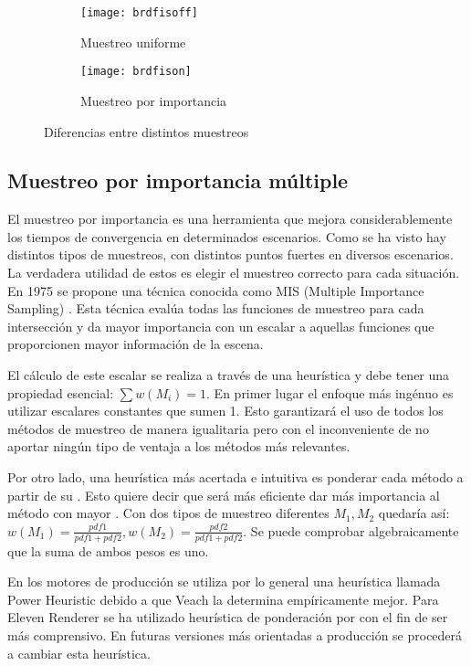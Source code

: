 \begin{figure}[H]
	\label{fig:brdfis}
	\centering
  \begin{subfigure}[b]{0.45\textwidth}
	\texttt{[image: brdfisoff]}
	\caption{Muestreo uniforme}
	\label{fig:brdfisoff}
  \end{subfigure}
  \hfill
  \begin{subfigure}[b]{0.45\textwidth}
	\texttt{[image: brdfison]}
	\caption{Muestreo por importancia}
	\label{fig:brdfison}
  \end{subfigure}
  \caption{Diferencias entre distintos muestreos}
\end{figure}

\subsection{Muestreo por importancia múltiple}

El muestreo por importancia es una herramienta que mejora considerablemente los tiempos de convergencia en determinados escenarios. Como se ha visto hay distintos tipos de muestreos, con distintos puntos fuertes en diversos escenarios. La verdadera utilidad de estos es elegir el muestreo correcto para cada situación. En 1975 se propone una técnica conocida como MIS (Multiple Importance Sampling) \cite{veach1995optimally}. Esta técnica evalúa todas las funciones de muestreo para cada intersección y da mayor importancia con un escalar a aquellas funciones que proporcionen mayor información de la escena.

El cálculo de este escalar se realiza a través de una heurística y debe tener una propiedad esencial: $\sum{w(M_i)} = 1$. En primer lugar el enfoque más ingénuo es utilizar escalares constantes que sumen 1. Esto garantizará el uso de todos los métodos de muestreo de manera igualitaria pero con el inconveniente de no aportar ningún tipo de ventaja a los métodos más relevantes. 

Por otro lado, una heurística más acertada e intuitiva es ponderar cada método a partir de su . Esto quiere decir que será más eficiente dar más importancia al método con mayor . Con dos tipos de muestreo diferentes $M_1, M_2$ quedaría así: $w(M_1) = \frac{pdf1}{pdf1 + pdf2}, w(M_2) = \frac{pdf2}{pdf1 + pdf2}$. Se puede comprobar algebraicamente que la suma de ambos pesos es uno.


En los motores de producción se utiliza por lo general una heurística llamada Power Heuristic debido a que Veach \cite{veach1995optimally} la determina empíricamente mejor. Para Eleven Renderer se ha utilizado heurística de ponderación por  con el fin de ser más comprensivo. En futuras versiones más orientadas a producción se procederá a cambiar esta heurística.

